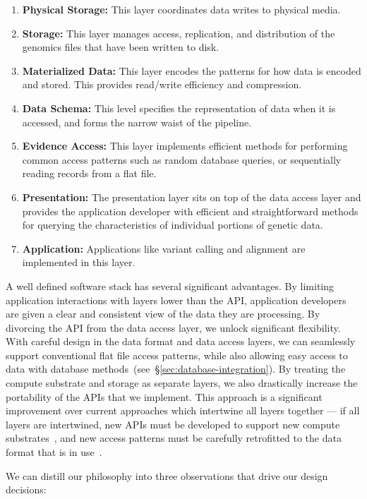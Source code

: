 \documentclass[10pt,twocolumn]{article}
\theoremstyle{plain}
\begin{document}
\begin{enumerate}
\item {\bf Physical Storage:} This layer coordinates data writes to physical media.
\item {\bf Storage:} This layer manages access, replication, and distribution of the genomics files that have been written to disk.
\item {\bf Materialized Data:} This layer encodes the patterns for how data is encoded and stored. This provides read/write efficiency
and compression.
\item {\bf Data Schema:} This level specifies the representation of data when it is accessed, and forms the narrow waist of the pipeline.
\item {\bf Evidence Access:} This layer implements efficient methods for performing common access patterns such as random database
queries, or sequentially reading records from a flat file.
\item {\bf Presentation:} The presentation layer sits on top of the data access layer and provides the application developer with efficient and
straightforward methods for querying the characteristics of individual portions of genetic data.
\item {\bf Application:} Applications like variant calling and alignment are implemented in this layer.
\end{enumerate}

A well defined software stack has several significant advantages. By limiting application interactions with layers lower than the API,
application developers are given a clear and consistent view of the data they are processing. By divorcing the API from the data
access layer, we unlock significant flexibility. With careful design in the data format and data access layers, we can seamlessly
support conventional flat file access patterns, while also allowing easy access to data with database
methods~(see~\S\ref{sec:database-integration}). By treating the compute substrate and storage as separate layers, we also
drastically increase the portability of the APIs that we implement. This approach is a significant improvement over current approaches
which intertwine all layers together --- if all layers are intertwined, new APIs must be developed to support new compute
substrates~\cite{niemenmaa12}, and new access patterns must be carefully retrofitted to the data format that is in use~\cite{kozanitis13}.

We can distill our philosophy into three observations that drive our design decisions:
\end{document}
